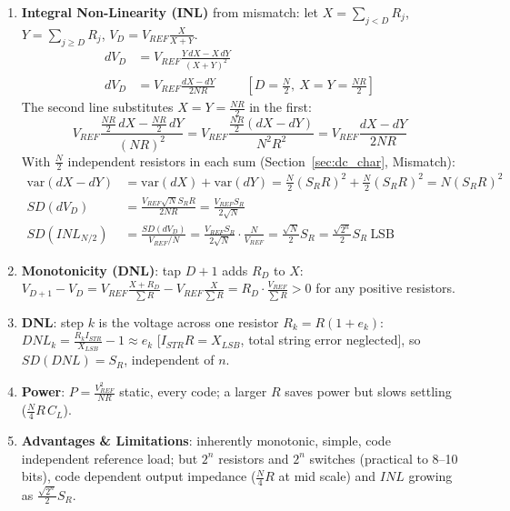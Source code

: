 \begin{enumerate}
    \paragraph{At Reference:} \(Z_{REF} = N R\) (constant, code independent).
  \item \textbf{Integral Non-Linearity (INL)} from mismatch: let \(X = \sum_{j < D} R_j\),
    \(Y = \sum_{j \geq D} R_j\), \(V_D = V_{REF}\frac{X}{X + Y}\).
    \begin{align*}
      dV_D &= V_{REF}\frac{Y\, dX - X\, dY}{(X + Y)^2} \\
      dV_D &= V_{REF}\frac{dX - dY}{2 N R} \hspace{1cm} \left[D = \tfrac{N}{2},\ X = Y = \tfrac{NR}{2}\right]
    \end{align*}
    The second line substitutes \(X = Y = \frac{NR}{2}\) in the first:
    \[
      V_{REF}\frac{\frac{NR}{2}\, dX - \frac{NR}{2}\, dY}{(NR)^2} = V_{REF}\frac{\frac{NR}{2}(dX - dY)}{N^2 R^2} = V_{REF}\frac{dX - dY}{2 N R}
    \]
    With \(\frac{N}{2}\) independent resistors in each sum (Section~\ref{sec:dc_char}, Mismatch):
    \begin{align*}
      \text{var}(dX - dY) &= \text{var}(dX) + \text{var}(dY) = \frac{N}{2}(S_R R)^2 + \frac{N}{2}(S_R R)^2 = N (S_R R)^2 \\
      SD(dV_D) &= \frac{V_{REF}\sqrt{N} S_R R}{2 N R} = \frac{V_{REF} S_R}{2\sqrt{N}} \\
      SD(INL_{N/2}) &= \frac{SD(dV_D)}{V_{REF}/N} = \frac{V_{REF} S_R}{2\sqrt{N}} \cdot \frac{N}{V_{REF}} = \frac{\sqrt{N}}{2} S_R = \frac{\sqrt{2^n}}{2} S_R \ \text{LSB}
    \end{align*}
  \item \textbf{Monotonicity (DNL)}: tap \(D + 1\) adds \(R_D\) to \(X\):
    \(V_{D+1} - V_D = V_{REF}\frac{X + R_D}{\sum R} - V_{REF}\frac{X}{\sum R} = R_D \cdot \frac{V_{REF}}{\sum R} > 0\) for any
    positive resistors.
  \item \textbf{DNL}: step \(k\) is the voltage across one resistor \(R_k = R(1 + e_k)\):
    \(DNL_k = \frac{R_k I_{STR}}{X_{LSB}} - 1 \approx e_k\) [\(I_{STR} R = X_{LSB}\), total string error neglected], so \(SD(DNL) = S_R\), independent of \(n\).
  \item \textbf{Power}: \(P = \frac{V_{REF}^2}{NR}\) static, every code; a larger \(R\) saves power but slows settling (\(\frac{N}{4}R\,C_L\)).
  \item \textbf{Advantages \& Limitations}: inherently monotonic, simple, code independent reference
    load; but \(2^n\) resistors and \(2^n\) switches (practical to 8--10 bits), code dependent output
    impedance (\(\frac{N}{4}R\) at mid scale) and \(INL\) growing as \(\frac{\sqrt{2^n}}{2} S_R\).
\end{enumerate}

